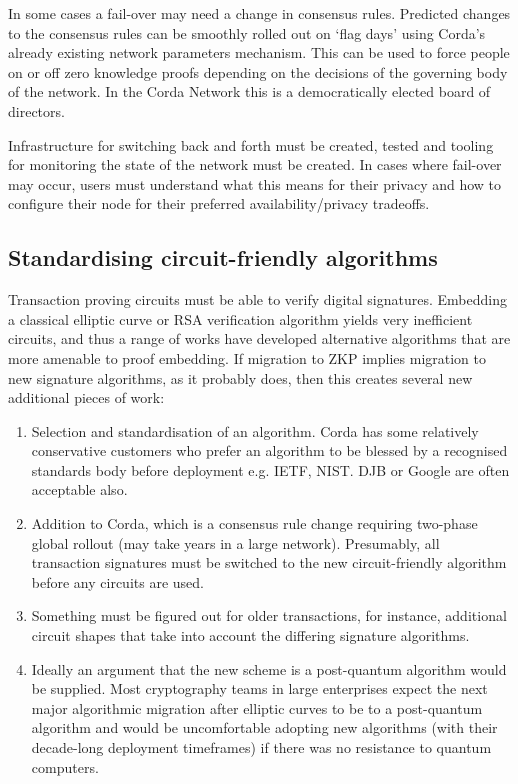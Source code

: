 \documentclass{article}
\begin{document}
In some cases a fail-over may need a change in consensus rules. Predicted changes to the consensus
rules can be smoothly rolled out on `flag days' using Corda's already existing network parameters mechanism.
This can be used to force people on or off zero knowledge proofs depending on the decisions of the governing
body of the network. In the Corda Network this is a democratically elected board of directors.

Infrastructure for switching back and forth must be created, tested and tooling for monitoring the state of
the network must be created. In cases where fail-over may occur, users must understand what this means for
their privacy and how to configure their node for their preferred availability/privacy tradeoffs.

\subsection{Standardising circuit-friendly algorithms}

Transaction proving circuits must be able to verify digital signatures. Embedding a classical elliptic curve or RSA
verification algorithm yields very inefficient circuits, and thus a range of works have developed alternative
algorithms that are more amenable to proof embedding. If migration to ZKP implies migration to new signature
algorithms, as it probably does, then this creates several new additional pieces of work:

\begin{enumerate}
    \item Selection and standardisation of an algorithm. Corda has some relatively conservative customers who
    prefer an algorithm to be blessed by a recognised standards body before deployment e.g. IETF, NIST. DJB or
    Google are often acceptable also.
    \item Addition to Corda, which is a consensus rule change requiring two-phase global rollout (may take
    years in a large network). Presumably, all transaction signatures must be switched to the new
    circuit-friendly algorithm before any circuits are used.
    \item Something must be figured out for older transactions, for instance, additional circuit shapes that
    take into account the differing signature algorithms.
    \item Ideally an argument that the new scheme is a post-quantum algorithm would be supplied. Most cryptography
    teams in large enterprises expect the next major algorithmic migration after elliptic curves to be to a post-quantum
    algorithm and would be uncomfortable adopting new algorithms (with their decade-long deployment timeframes) if
    there was no resistance to quantum computers.
\end{enumerate}
\end{document}

